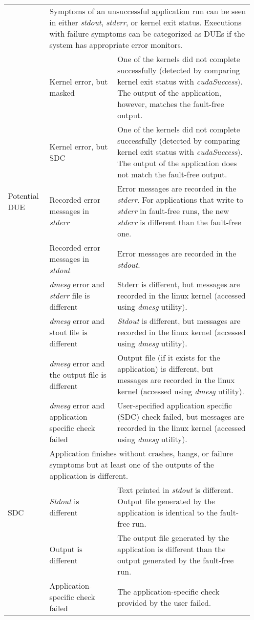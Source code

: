 \begin{table}[tbp]
\begin{tabular}{|l|p{3cm}|p{10cm}|}
	\multirow{8}{*}{Potential DUE} & \multicolumn{2}{|p{13cm}|}{Symptoms of an unsuccessful application run can be seen in either {\it stdout}, {\it stderr}, or kernel exit status. Executions with failure symptoms can be categorized as DUEs if the system has appropriate error monitors.} \\
	\cline{2-3}
											& Kernel error, but masked & One of the kernels did not complete successfully (detected by comparing kernel exit status with {\it cudaSuccess}). The output of the application, however, matches the fault-free output. \\ 
	\cline{2-3}
											& Kernel error, but SDC & One of the kernels did not complete successfully (detected by comparing kernel exit status with {\it cudaSuccess}). The output of the application does not match the fault-free output. \\ 
	\cline{2-3}
											& Recorded error messages in {\it stderr} & Error messages are recorded in the {\it stderr}. For applications that write to {\it stderr} in fault-free runs, the new {\it stderr} is different than the fault-free one. \\ 
	\cline{2-3}
											& Recorded error messages in {\it stdout} & Error messages are recorded in the {\it stdout}. \\
	\cline{2-3}
											& {\it dmesg} error and {\it stderr} file is different & Stderr is different, but messages are recorded in the linux kernel (accessed using {\it dmesg} utility). \\
	\cline{2-3}
											& {\it dmesg} error and stout file is different & {\it Stdout} is different, but messages are recorded in the linux kernel (accessed using {\it dmesg} utility). \\
	\cline{2-3}
											& {\it dmesg} error and the output file is different & Output file (if it exists for the application) is different, but messages are recorded in the linux kernel (accessed using {\it dmesg} utility).  \\
	\cline{2-3}
											& {\it dmesg} error and application specific check failed & User-specified application specific (SDC) check failed,  but messages are recorded in the linux kernel (accessed using {\it dmesg} utility). \\
	\hline
	\hline


	\multirow{3}{*}{SDC} & \multicolumn{2}{|p{13cm}|}{Application finishes without crashes, hangs, or failure symptoms but at least one of the outputs of the application is different.} \\ 
	\cline{2-3}
											& {\it Stdout} is different & Text printed in {\it stdout} is different. Output file generated by the application is identical to the fault-free run. \\ 
	\cline{2-3}
											&	Output is different &  The output file generated by the application is different than the output generated by the fault-free run. \\ 
	\cline{2-3}
											&	Application-specific check failed &  The application-specific check provided by the user failed. \\
	\hline 
	\hline
	

\end{tabular}
\end{table}
